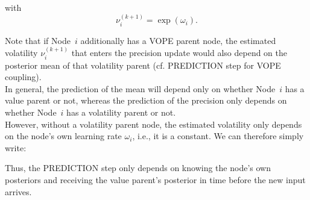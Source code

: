 \noindent
{}%
\vspace{0.5cm}

\noindent
with
\begin{equation*}
\nu_i^{(k+1)} = \exp(\omega_i).
\end{equation*}

Note that if Node~$i$ additionally has a \textsf{VOPE} parent node, the estimated volatility $\nu_i^{(k+1)}$ that enters the precision update would also depend on the posterior mean of that volatility parent (cf. \textsf{PREDICTION step} for \textsf{VOPE} coupling).\\

In general, the prediction of the mean will depend only on whether Node~$i$ has a value parent or not, whereas the prediction of the precision only depends on whether Node~$i$ has a volatility parent or not. \\

However, without a volatility parent node, the estimated volatility only depends on the node's own learning rate $\omega_i$, i.e., it is a constant. We can therefore simply write:
\vspace{0.5cm}

\noindent
{}%
\vspace{0.5cm}

\noindent

Thus, the \textsf{PREDICTION step} only depends on knowing the node's own posteriors and receiving the value parent's posterior in time before the new input arrives.
